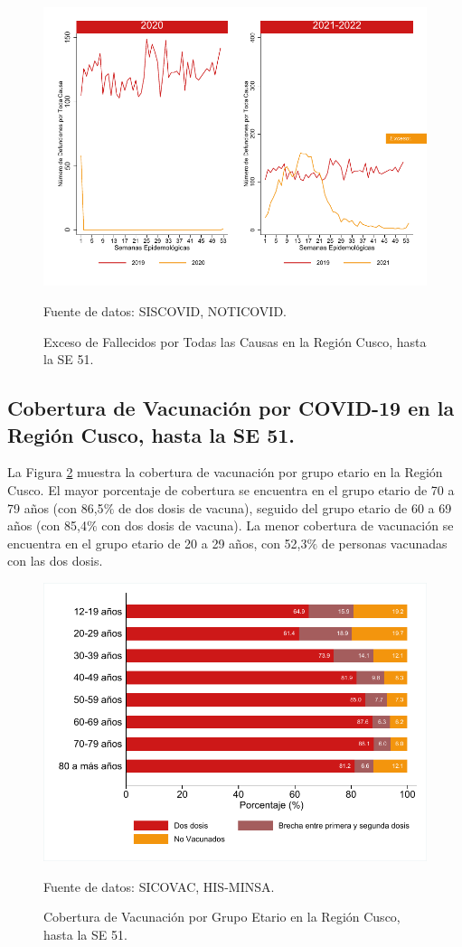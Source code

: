 \documentclass[12pt,a4paper,openany]{book}
\begin{document}
	\begin{figure}[h]
	\caption{Exceso de Fallecidos por Todas las Causas en la Región Cusco,  hasta la SE 51.}\label{fig:exceso_regional}
	\begin{center}
		\includegraphics[width=0.85\linewidth]{../figuras/exceso_region.pdf}
	\end{center}
	{\footnotesize {Fuente de datos: SISCOVID, NOTICOVID.}}
	\end{figure}
\clearpage

	\subsection*{Cobertura de Vacunación por COVID-19 en la Región Cusco, hasta la SE 51.}
\noindent La Figura \ref{fig:vacuna_edad} muestra la cobertura de vacunación por grupo etario en la Región Cusco. El mayor porcentaje de cobertura se encuentra en el grupo etario de 70 a 79 años (con 86,5$\%$ de dos dosis de vacuna), seguido del grupo etario de 60 a 69 años  (con 85,4$\%$ con dos dosis de vacuna). La menor cobertura de vacunación se encuentra en el grupo etario de 20 a 29 años, con 52,3$\%$ de personas vacunadas con las dos dosis. 

\begin{figure}[h]
	\caption{Cobertura de Vacunación por Grupo Etario en la Región Cusco, hasta la SE 51. }\label{fig:vacuna_edad}
	\begin{center}
		\includegraphics[width=0.65\linewidth]{../figuras/vacunacion_grupo_edad.pdf}
	\end{center}
	{\footnotesize {Fuente de datos: SICOVAC, HIS-MINSA.}}
\end{figure}
\end{document}
